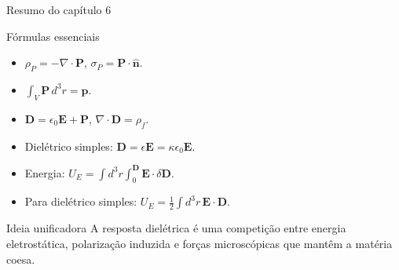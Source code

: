 \documentclass[aspectratio=169]{beamer}
\begin{document}
\begin{frame}{Resumo do capítulo 6}

\footnotesize

\begin{mybox}{Fórmulas essenciais}
\begin{itemize}
\item \(\rho_P=-\nabla\cdot\mathbf P\), \(\sigma_P=\mathbf P\cdot\hat{\mathbf n}\).
\item \(\displaystyle \int_V\mathbf P\,d^3r=\mathbf p\).
\item \(\mathbf D=\epsilon_0\mathbf E+\mathbf P\), \(\nabla\cdot\mathbf D=\rho_f\).
\item Dielétrico simples: \(\mathbf D=\epsilon\mathbf E=\kappa\epsilon_0\mathbf E\).
\item Energia: \(\displaystyle U_E=\int d^3r\int_0^{\mathbf D}\mathbf E\cdot\delta\mathbf D\).
\item Para dielétrico simples: \(\displaystyle U_E=\frac12\int d^3r\,\mathbf E\cdot\mathbf D\).
\end{itemize}
\end{mybox}

\begin{alertblock}{Ideia unificadora}
A resposta dielétrica é uma competição entre energia eletrostática, polarização
induzida e forças microscópicas que mantêm a matéria coesa.
\end{alertblock}

\end{frame}
\end{document}
